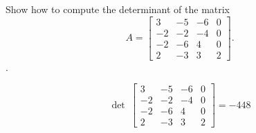 
\begin{exerciseStatement}


Show how to compute the determinant of the matrix \[A= \left[\begin{array}{cccc}
3 & -5 & -6 & 0 \\
-2 & -2 & -4 & 0 \\
-2 & -6 & 4 & 0 \\
2 & -3 & 3 & 2
\end{array}\right] .\].


\end{exerciseStatement}
    
\begin{exerciseAnswer} 
\[\operatorname{det}\  \left[\begin{array}{cccc}
3 & -5 & -6 & 0 \\
-2 & -2 & -4 & 0 \\
-2 & -6 & 4 & 0 \\
2 & -3 & 3 & 2
\end{array}\right] = -448 \]
\end{exerciseAnswer}
    
